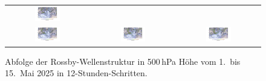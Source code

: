 \begin{figure}
\begin{tabular}{ccc}
		\includegraphics[width=0.32\textwidth, trim=3.1cm 3cm 3.0cm 0.8cm, clip]{papers/rossby/images/data_2025_5_3_12:00_500.pdf}   \\
		\includegraphics[width=0.32\textwidth, trim=3.1cm 3cm 3.0cm 0.8cm, clip]{papers/rossby/images/data_2025_5_4_00:00_500.pdf} &
		\includegraphics[width=0.32\textwidth, trim=3.1cm 3cm 3.0cm 0.8cm, clip]{papers/rossby/images/data_2025_5_4_12:00_500.pdf} &
		\includegraphics[width=0.32\textwidth, trim=3.1cm 3cm 3.0cm 0.8cm, clip]{papers/rossby/images/data_2025_5_5_00:00_500.pdf}   \\
	\end{tabular}
	\caption{Abfolge der Rossby-Wellenstruktur in 500\,hPa Höhe vom 1.\ bis 15.\ Mai 2025 in 12-Stunden-Schritten.}
	\label{fig:rossby_grid}
\end{figure}

